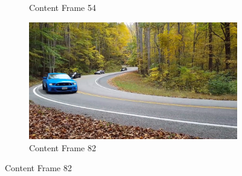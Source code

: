 \documentclass[runningheads]{llncs}
\begin{document}
\begin{figure}[h!]
\begin{subfigure}[t]{0.3\linewidth}
    \caption{Content Frame 54}
\end{subfigure}
\begin{subfigure}[t]{0.3\linewidth}
    \centering
    \includegraphics[width=1\linewidth]{cars/small_0082.png}
    \caption{Content Frame 82}
\end{subfigure}


\end{figure}
\end{document}
